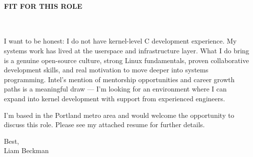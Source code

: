 \paragraph{FIT FOR THIS ROLE}\

\vspace*{\baselineskip}

I want to be honest: I do not have kernel-level C development experience. My systems work has lived at the userspace and infrastructure layer. What I do bring is a genuine open-source culture, strong Linux fundamentals, proven collaborative development skills, and real motivation to move deeper into systems programming. Intel's mention of mentorship opportunities and career growth paths is a meaningful draw --- I'm looking for an environment where I can expand into kernel development with support from experienced engineers.

\vspace*{\baselineskip}

I'm based in the Portland metro area and would welcome the opportunity to discuss this role. Please see my attached resume for further details.

\vspace*{\baselineskip}

Best,\\

Liam Beckman

\vfill \myBreak{}



